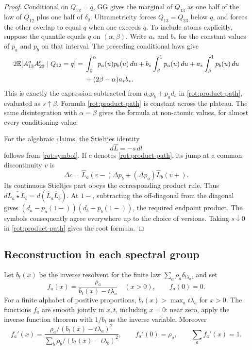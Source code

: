 \begin{proof}
Conditional on \(Q_{12}=q\), GG gives the marginal of \(Q_{13}\)
as one half of the law of \(Q_{12}\) plus one half of \(\delta_q\).
Ultrametricity forces \(Q_{13}=Q_{23}\) below \(q\), and forces the
other overlap to equal \(q\) when one exceeds \(q\).
To include atoms explicitly, suppose the quantile equals \(q\) on
\((\alpha,\beta)\).  Write \(a_*\) and \(b_*\) for the constant
values of \(p_a\) and \(p_b\) on that interval.  The preceding
conditional laws give
\[
 \begin{split}
 2\mathbb E[A^a_{13}A^b_{23}\mid Q_{12}=q]
 ={}&\int_0^\alpha p_a(u)p_b(u)\,du
       +b_*\int_\beta^1p_a(u)\,du
       +a_*\int_\beta^1p_b(u)\,du\\
    &+(2\beta-\alpha)a_*b_* .
 \end{split}
\]
This is exactly the expression subtracted from
\(d_a p_b+p_a d_b\) in \eqref{rot:product-path}, evaluated as
\(s\uparrow\beta\).  Formula \eqref{rot:product-path} is constant across
the plateau.  The same disintegration with \(\alpha=\beta\)
gives the formula at non-atomic values, for almost every
conditioning value.

For the algebraic claims, the Stieltjes identity
\[
 d\widehat L=-s\,dl
\]
follows from \eqref{rot:symbol}.  If \(c\) denotes
\eqref{rot:product-path}, its jump at a common discontinuity \(v\)
is
\[
 \Delta c=\widehat L_a(v-)\Delta p_b
                  +(\Delta p_a)\widehat L_b(v+).
\]
Its continuous Stieltjes part obeys the corresponding product rule.
Thus \(d\widehat{L_a\star L_b}
=d(\widehat L_a\widehat L_b)\).
At \(1-\), subtracting the off-diagonal from the diagonal gives
\((d_a-p_a(1-))(d_b-p_b(1-))\), the required endpoint product.
The symbols consequently agree everywhere up to the choice of
versions.  Taking \(s\downarrow0\) in \eqref{rot:product-path}
gives the root formula.
\end{proof}

\subsection{Reconstruction in each spectral group}

Let \(b_t(x)\) be the inverse resolvent for the finite law
\(\sum_a\rho_a\delta_{t\lambda_a}\), and set
\begin{equation}\label{rot:f}
 f_a(x)=\frac{\rho_a}{b_t(x)-t\lambda_a}\quad(x>0),
 \qquad f_a(0)=0.
\end{equation}
For a finite alphabet of positive proportions,
\(b_t(x)>\max_a t\lambda_a\) for \(x>0\).  The functions \(f_a\)
are smooth jointly in \(x,t\), including \(x=0\): near zero, apply
the inverse function theorem with \(1/b_t\) as the inverse variable.
Moreover
\begin{equation}\label{rot:f-derivative}
 f_a'(x)=
 \frac{\rho_a/(b_t(x)-t\lambda_a)^2}
      {\sum_b\rho_b/(b_t(x)-t\lambda_b)^2},
 \qquad
 f_a'(0)=\rho_a,\qquad \sum_a f_a'(x)=1 .
\end{equation}

